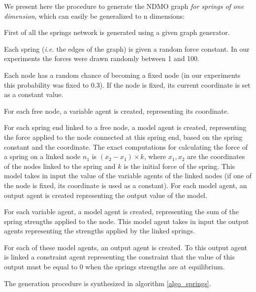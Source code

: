 We present here the procedure to generate the NDMO graph \emph{for springs of one dimension}, which can easily be generalized to n dimensions:
\begin{compactitem}
\item First of all the springs network is generated using a given graph generator.
\item Each spring (\emph{i.e.} the edges of the graph) is given a random force constant. In our experiments the forces were drawn randomly between 1 and 100.
\item Each node has a random chance of becoming a fixed node (in our experiments this probability was fixed to 0.3). If the node is fixed, its current coordinate is set as a constant value.
\item For each free node, a variable agent is created, representing its coordinate.
\item For each spring end linked to a free node, a model agent is created, representing the force applied to the node connected at this spring end, based on the spring constant and the coordinate. The exact computations for calculating the force of a spring on a linked node $n_1$ is $(x_2 - x_1) \times k$, where $x_1, x_2$ are the coordinates of the nodes linked to the spring and $k$ is the initial force of the spring. This model takes in input the value of the variable agents of the linked nodes (if one of the node is fixed, its coordinate is used as a constant). For each model agent, an output agent is created representing the output value of the model.
\item For each variable agent, a model agent is created, representing the sum of the spring strengths applied to the node. This model agent takes in input the output agents representing the strengths applied by the linked springs.
\item For each of these model agents, an output agent is created. To this output agent is linked a constraint agent representing the constraint that the value of this output must be equal to 0 when the springs strengths are at equilibrium.
\end{compactitem}

The generation procedure is synthesized in algorithm \ref{algo_springs}.

